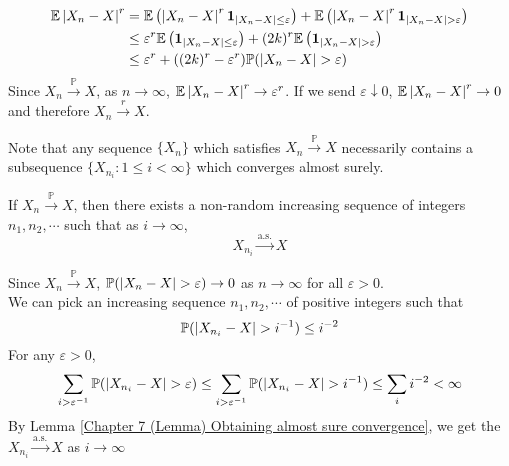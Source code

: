 \documentclass{huhtakm-template-book}
\newcommand{\prob}{\mathbb{P}}
\newcommand{\expect}{\mathbb{E}}
\begin{document}
\begin{proofing}
\begin{enumerate}
\begin{align*}
			\expect\abs{X_{n}-X}^{r}&=\expect\left(\abs{X_{n}-X}^{r}\mathbf{1}_{\abs{X_{n}-X}\leq\varepsilon}\right)+\expect\left(\abs{X_{n}-X}^{r}\mathbf{1}_{\abs{X_{n}-X}>\varepsilon}\right)\\
			&\leq\varepsilon^{r}\expect\left(\mathbf{1}_{\abs{X_{n}-X}\leq\varepsilon}\right)+(2k)^{r}\expect\left(\mathbf{1}_{\abs{X_{n}-X}>\varepsilon}\right)\\
			&\leq\varepsilon^{r}+((2k)^{r}-\varepsilon^{r})\prob(\abs{X_{n}-X}>\varepsilon)
		\end{align*}
		Since $X_{n}\xrightarrow{\prob}X$, as $n\to\infty$, $\expect\abs{X_{n}-X}^{r}\to\varepsilon^{r}$. If we send $\varepsilon\downarrow 0$, $\expect\abs{X_{n}-X}^{r}\to 0$ and therefore $X_{n}\xrightarrow{r}X$.
	\end{enumerate}
\end{proofing}
Note that any sequence $\{X_{n}\}$ which satisfies $X_{n}\xrightarrow{\prob}X$ necessarily contains a subsequence $\{X_{n_{i}}:1\leq i<\infty\}$ which converges almost surely.
\begin{thm}
	If $X_{n}\xrightarrow{\prob}X$, then there exists a non-random increasing sequence of integers $n_{1},n_{2},\cdots$ such that as $i\to\infty$,
	\begin{equation*}
		X_{n_{i}}\xrightarrow{\text{a.s.}}X
	\end{equation*}
\end{thm}
\begin{proofing}
	Since $X_{n}\xrightarrow{\prob}X$, $\prob(\abs{X_{n}-X}>\varepsilon)\to 0$ as $n\to\infty$ for all $\varepsilon>0$.\\
	We can pick an increasing sequence $n_{1},n_{2},\cdots$ of positive integers such that
	\begin{equation*}
		\prob(\abs{X_{n_{i}}-X}>i^{-1})\leq i^{-2}
	\end{equation*}
	For any $\varepsilon>0$,
	\begin{equation*}
		\sum_{i>\varepsilon^{-1}}\prob(\abs{X_{n_{i}}-X}>\varepsilon)\leq\sum_{i>\varepsilon^{-1}}\prob(\abs{X_{n_{i}}-X}>i^{-1})\leq\sum_{i}i^{-2}<\infty
	\end{equation*}
	By Lemma \ref{Chapter 7 (Lemma) Obtaining almost sure convergence}, we get the $X_{n_{i}}\xrightarrow{\text{a.s.}}X$ as $i\to\infty$
\end{proofing}
\end{document}
